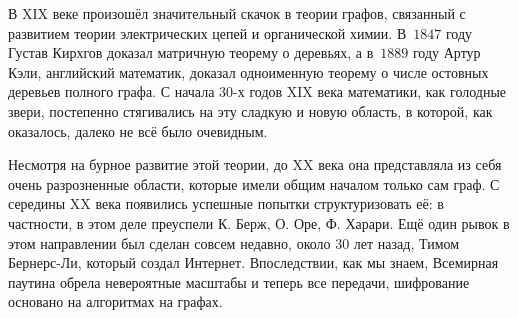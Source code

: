 	В XIX веке произошёл значительный скачок в теории графов, связанный с развитием теории электрических цепей и органической химии. В~$1847$ году Густав Кирхгов доказал матричную теорему о деревьях, а в~$1889$ году Артур Кэли, английский математик, доказал одноименную теорему о числе остовных деревьев полного графа. С начала $30$-х годов XIX века математики, как голодные звери, постепенно стягивались на эту сладкую и новую область, в которой, как оказалось, далеко не всё было очевидным.
	
	Несмотря на бурное развитие этой теории, до XX века она представляла из себя очень разрозненные области, которые имели общим началом только сам граф. С середины XX века появились успешные попытки структуризовать её: в частности, в этом деле преуспели К. Берж, О. Оре, Ф. Харари. Ещё один рывок в этом направлении был сделан совсем недавно, около 30 лет назад, Тимом Бернерс-Ли, который создал Интернет. Впоследствии, как мы знаем, Всемирная паутина обрела невероятные масштабы и теперь все передачи, шифрование основано на алгоритмах на графах.
	
